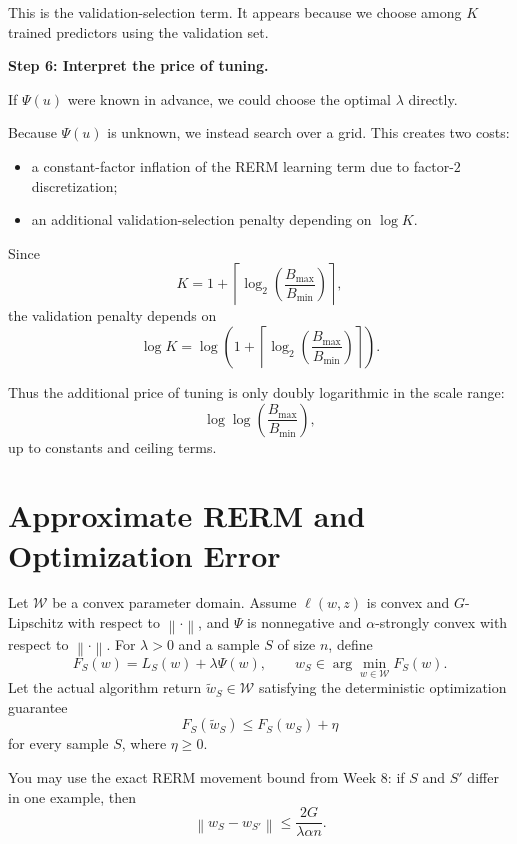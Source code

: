 \documentclass[11pt]{article}
\newcommand{\norm}[1]{\left\lVert #1 \right\rVert}
\begin{document}
\begin{enumerate}
\begin{solutionbox}
This is the validation-selection term. It appears because we choose among $K$ trained predictors using the validation set.

\medskip

\textbf{Step 6: Interpret the price of tuning.}

If $\Psi(u)$ were known in advance, we could choose the optimal $\lambda$ directly.

Because $\Psi(u)$ is unknown, we instead search over a grid. This creates two costs:

\begin{itemize}
    \item a constant-factor inflation of the RERM learning term due to factor-$2$ discretization;
    \item an additional validation-selection penalty depending on $\log K$.
\end{itemize}

Since
\[
K
=
1+
\left\lceil
\log_2\left(\frac{B_{\max}}{B_{\min}}\right)
\right\rceil,
\]
the validation penalty depends on
\[
\log K
=
\log\left(
1+
\left\lceil
\log_2\left(\frac{B_{\max}}{B_{\min}}\right)
\right\rceil
\right).
\]

Thus the additional price of tuning is only doubly logarithmic in the scale range:
\[
\log\log\left(\frac{B_{\max}}{B_{\min}}\right),
\]
up to constants and ceiling terms.

\end{solutionbox}

\end{enumerate}

\section{Approximate RERM and Optimization Error}

Let $\mathcal W$ be a convex parameter domain. Assume $\ell(w,z)$ is convex and $G$-Lipschitz with respect to $\norm{\cdot}$, and $\Psi$ is nonnegative and $\alpha$-strongly convex with respect to $\norm{\cdot}$. For $\lambda>0$ and a sample $S$ of size $n$, define
\[
F_S(w)=L_S(w)+\lambda\Psi(w),
\qquad
w_S\in\arg\min_{w\in\mathcal W}F_S(w).
\]
Let the actual algorithm return $\widetilde w_S\in\mathcal W$ satisfying the deterministic optimization guarantee
\[
F_S(\widetilde w_S)\le F_S(w_S)+\eta
\]
for every sample $S$, where $\eta\ge0$.

You may use the exact RERM movement bound from Week 8: if $S$ and $S'$ differ in one example, then
\[
\norm{w_S-w_{S'}}\le \frac{2G}{\lambda\alpha n}.
\]
\end{document}
